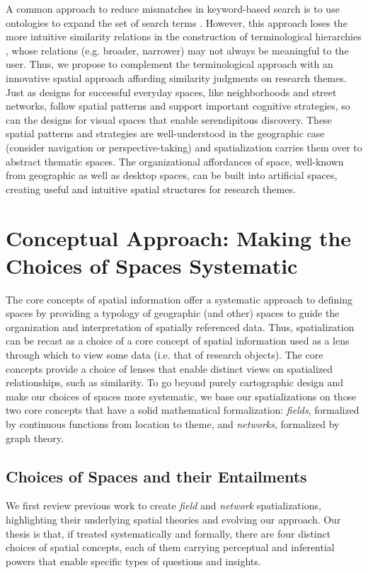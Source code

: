 \documentclass[a4paper,UKenglish]{lipics-v2018}
\begin{document}
A common approach to reduce mismatches in keyword-based search is to use ontologies to expand the set of search terms \cite{Baeza-Yates2011b}. However, this approach loses the more intuitive similarity relations in the construction of terminological hierarchies \cite{Gardenfors2000f}, whose relations (e.g. broader, narrower) may not always be meaningful to the user. Thus, we propose to complement the terminological approach with an innovative spatial approach affording similarity judgments on research themes. Just as designs for successful everyday spaces, like neighborhoods and street networks, follow spatial patterns \cite{Alexander1977a} and support important cognitive strategies, so can the designs for visual spaces that enable serendipitous discovery. These spatial patterns and strategies are well-understood in the geographic case (consider navigation or perspective-taking) and spatialization carries them over to abstract thematic spaces. The organizational affordances of space, well-known from geographic as well as desktop spaces, can be built into artificial spaces, creating useful and intuitive spatial structures for research themes.

\section{Conceptual Approach: Making the Choices of Spaces Systematic}
The core concepts of spatial information \cite{Kuhn2012e} offer a systematic approach to defining spaces by providing a typology of geographic (and other) spaces to guide the organization and interpretation of spatially referenced data. Thus, spatialization can be recast as a choice of a core concept of spatial information used as a lens through which to view some data (i.e. that of research objects). The core concepts provide a choice of lenses that enable distinct views on spatialized relationships, such as similarity. To go beyond purely cartographic design \cite{MacEachren2004c} and make our choices of spaces more systematic, we base our spatializations on those two core concepts that have a solid mathematical formalization: \textit{fields}, formalized by continuous functions from location to theme, and \textit{networks}, formalized by graph theory.

\subsection{Choices of Spaces and their Entailments}
We first review previous work to create  \textit{field} and \textit{network} spatializations, highlighting their underlying spatial theories and evolving our approach. Our thesis is that, if treated systematically and formally, there are 
four distinct choices of spatial concepts, each of them carrying perceptual and inferential powers that enable specific types of questions and insights. \newline
\end{document}
